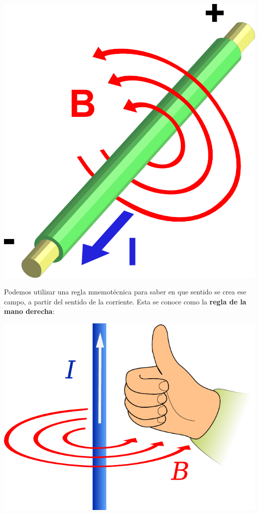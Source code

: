 \documentclass{article}
\begin{document}
\begin{center}
	\includegraphics[scale=0.30]{figuras/corriente-campo.pdf}
\label{fig:campo}
\end{center}
Podemos utilizar una regla mnemotécnica para saber en que sentido se crea ese campo, a partir del sentido de la corriente. Esta se conoce como la \textbf{regla de la mano derecha}:
\begin{center}
	\includegraphics[scale=0.450]{figuras/corriente-campo-reglamano.pdf}
\label{fig:regla}
\end{center}
\end{document}
